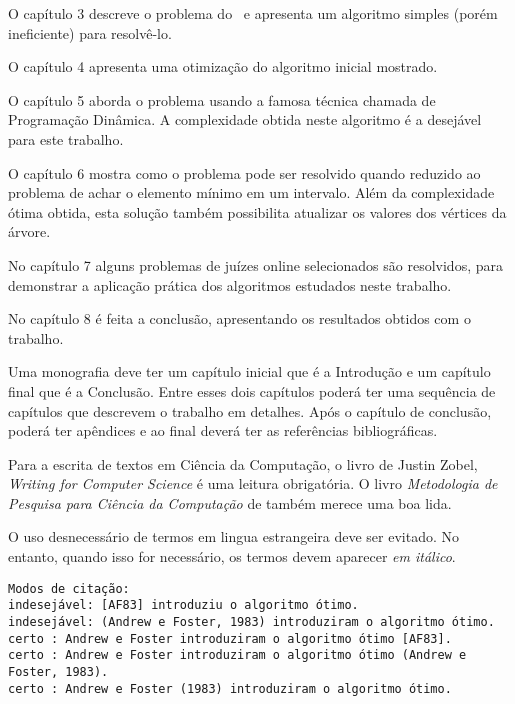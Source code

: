 O capítulo 3 descreve o problema do \LCA\ e apresenta um algoritmo simples (porém ineficiente) para resolvê-lo.

\vspace{0.2cm}

O capítulo 4 apresenta uma otimização do algoritmo inicial mostrado.

\vspace{0.2cm}

O capítulo 5 aborda o problema usando a famosa técnica chamada de Programação Dinâmica. A complexidade obtida neste algoritmo é a desejável para este trabalho.

\vspace{0.2cm}

O capítulo 6 mostra como o problema pode ser resolvido quando reduzido ao problema de achar o elemento mínimo em um intervalo. Além da complexidade ótima obtida, esta solução também possibilita atualizar os valores dos vértices da árvore.

\vspace{0.2cm}

No capítulo 7 alguns problemas de juízes online selecionados são resolvidos, para demonstrar a aplicação prática dos algoritmos estudados neste trabalho.

\vspace{0.2cm}

No capítulo 8 é feita a conclusão, apresentando os resultados obtidos com o trabalho.



\iffalse
Uma monografia deve ter um capítulo inicial que é a Introdução e um
capítulo final que é a Conclusão. Entre esses dois capítulos poderá
ter uma sequência de capítulos que descrevem o trabalho em detalhes.
Após o capítulo de conclusão, poderá ter apêndices e ao final deverá
ter as referências bibliográficas.


Para a escrita de textos em Ciência da Computação, o livro de Justin Zobel, 
\emph{Writing for Computer Science} \citep{zobel:04} é uma leitura obrigatória. 
O livro \emph{Metodologia de Pesquisa para Ciência da Computação} de 
\citet{waz:09} também merece uma boa lida.

O uso desnecessário de termos em lingua estrangeira deve ser evitado. No entanto,
quando isso for necessário, os termos devem aparecer \emph{em itálico}.

\begin{small}
\begin{verbatim}
Modos de citação:
indesejável: [AF83] introduziu o algoritmo ótimo.
indesejável: (Andrew e Foster, 1983) introduziram o algoritmo ótimo.
certo : Andrew e Foster introduziram o algoritmo ótimo [AF83].
certo : Andrew e Foster introduziram o algoritmo ótimo (Andrew e Foster, 1983).
certo : Andrew e Foster (1983) introduziram o algoritmo ótimo.
\end{verbatim}
\end{small}

